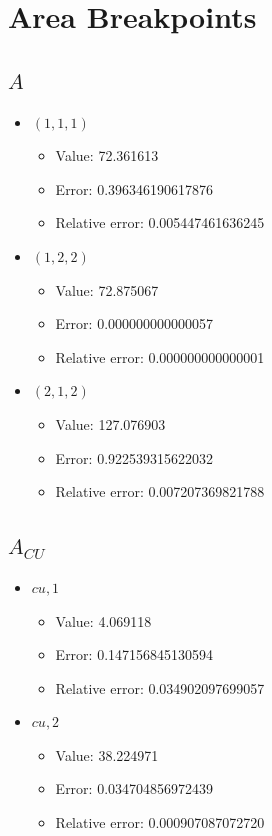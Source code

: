 \documentclass{article}%
\begin{document}
\section{Area Breakpoints}%
\thispagestyle{plain}%
\subsection{$A$}%
\begin{itemize}%
	\item $(1, 1, 1)$%
	\begin{itemize}%
		\item Value: 72.361613%
		\item Error: 0.396346190617876%
		\item Relative error: 0.005447461636245%
	\end{itemize}%
	\item $(1, 2, 2)$%
	\begin{itemize}%
		\item Value: 72.875067%
		\item Error: 0.000000000000057%
		\item Relative error: 0.000000000000001%
	\end{itemize}%
	\item $(2, 1, 2)$%
	\begin{itemize}%
		\item Value: 127.076903%
		\item Error: 0.922539315622032%
		\item Relative error: 0.007207369821788%
	\end{itemize}%
\end{itemize}%
\subsection{$A_{CU}$}%
\begin{itemize}%
	\item $\textit{cu},1$%
	\begin{itemize}%
		\item Value: 4.069118%
		\item Error: 0.147156845130594%
		\item Relative error: 0.034902097699057%
	\end{itemize}%
	\item $\textit{cu},2$%
	\begin{itemize}%
		\item Value: 38.224971%
		\item Error: 0.034704856972439%
		\item Relative error: 0.000907087072720%
	\end{itemize}%
\end{itemize}%
\end{document}
